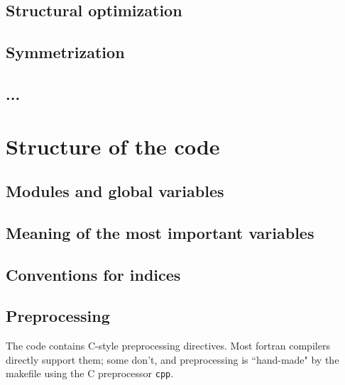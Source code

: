 \documentclass[12pt,a4paper]{article}
\begin{document}
\subsection{Structural optimization}

\subsection{Symmetrization}

\subsection{...}

\section{Structure of the code}

\subsection{Modules and global variables}

\subsection{Meaning of the most important variables}

\subsection{Conventions for indices}

\subsection{Preprocessing}

\label{preproc}
The code contains C-style preprocessing directives. Most
fortran compilers directly support them; some don't, and
preprocessing is ``hand-made" by the makefile using the C
preprocessor {\tt cpp}.
\end{document}
